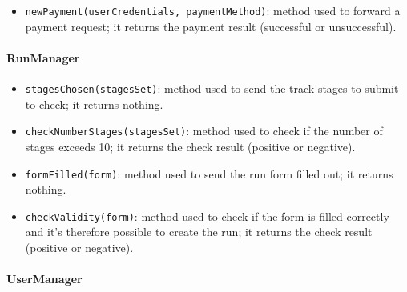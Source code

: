 \begin{itemize}
\item[ ]\texttt{newPayment(userCredentials, paymentMethod)}: method used to forward a payment request; it returns the payment result (successful or unsuccessful).
\end{itemize}

\paragraph{RunManager}

\begin{itemize}
\item[ ]\texttt{stagesChosen(stagesSet)}: method used to send the track stages to submit to check; it returns nothing.

\item[ ]\texttt{checkNumberStages(stagesSet)}: method used to check if the number of stages exceeds 10; it returns the check result (positive or negative).

\item[ ]\texttt{formFilled(form)}: method used to send the run form filled out; it returns nothing.

\item[ ]\texttt{checkValidity(form)}: method used to check if the form is filled correctly and it's therefore possible to create the run; it returns the check result (positive or negative).
\end{itemize}

\paragraph{UserManager}

